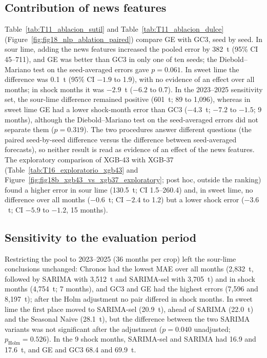 \documentclass[forecasting,article,submit,moreauthors]{Definitions/mdpi}
\begin{document}
\subsection{Contribution of news features}
Table~\ref{tab:T11_ablacion_sutil} and Table~\ref{tab:T11_ablacion_dulce} (Figure~\ref{fig:fig18_nlp_ablation_paired}) compare GE with GC3, seed by seed. In sour lime, adding the news features increased the pooled error by 382~t (95\% CI 45--711), and GE was better than GC3 in only one of ten seeds; the Diebold--Mariano test on the seed-averaged errors gave $p=0.061$. In sweet lime the difference was 0.1~t (95\% CI $-1.9$ to 1.9), with no evidence of an effect over all months; in shock months it was $-2.9$~t ($-6.2$ to 0.7). In the 2023--2025 sensitivity set, the sour-lime difference remained positive (601~t; 89 to 1,096), whereas in sweet lime GE had a lower shock-month error than GC3 ($-4.3$~t; $-7.2$ to $-1.5$; 9 months), although the Diebold--Mariano test on the seed-averaged errors did not separate them ($p=0.319$). The two procedures answer different questions (the paired seed-by-seed difference versus the difference between seed-averaged forecasts), so neither result is read as evidence of an effect of the news features. The exploratory comparison of XGB-43 with XGB-37 (Table~\ref{tab:T16_exploratorio_xgb43} and Figure~\ref{fig:fig18b_xgb43_vs_xgb37_exploratory}; post hoc, outside the ranking) found a higher error in sour lime (130.5~t; CI 1.5--260.4) and, in sweet lime, no difference over all months ($-0.6$~t; CI $-2.4$ to 1.2) but a lower shock error ($-3.6$~t; CI $-5.9$ to $-1.2$, 15 months).

\subsection{Sensitivity to the evaluation period}
Restricting the pool to 2023--2025 (36 months per crop) left the sour-lime conclusions unchanged: Chronos had the lowest MAE over all months (2,832~t, followed by SARIMA with 3,512~t and SARIMA-sel with 3,705~t) and in shock months (4,754~t; 7 months), and GC3 and GE had the highest errors (7,596 and 8,197~t); after the Holm adjustment no pair differed in shock months. In sweet lime the first place moved to SARIMA-sel (20.9~t), ahead of SARIMA (22.0~t) and the Seasonal Naive (28.1~t), but the difference between the two SARIMA variants was not significant after the adjustment ($p=0.040$ unadjusted; $p_{\text{Holm}}=0.526$). In the 9 shock months, SARIMA-sel and SARIMA had 16.9 and 17.6~t, and GE and GC3 68.4 and 69.9~t.
\end{document}
